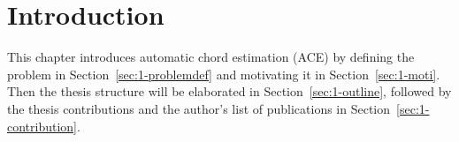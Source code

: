 

\chapter{Introduction}\label{cp:intro}





This chapter introduces automatic chord estimation (ACE) by defining the problem in Section~\ref{sec:1-problemdef} and motivating it in Section~\ref{sec:1-moti}. Then the thesis structure will be elaborated in Section~\ref{sec:1-outline}, followed by the thesis contributions and the author's list of publications in Section~\ref{sec:1-contribution}.

